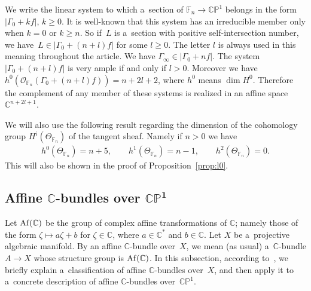 \documentclass[11pt]{article}
\numberwithin{equation}{section}
\begin{document}
We write the linear system to which a~section of $\mathbb{F}_n\to\mathbb{CP}^1$ belongs in the form $|\Gamma_0+kf|$, $k\ge 0$.
It is well-known that this system has an irreducible member only when $k=0$ or $k\ge n$.
So if~$L$ is a~section with positive self-intersection number, we have~$L\in |\Gamma_0 + (n+l)f|$ for some $l\ge 0$.
The letter $l$ is always used in this meaning throughout the article.
We have $\Gamma_{\infty}\in |\Gamma_0+nf|$.
The system $|\Gamma_0 + (n+l)f|$ is very ample if and only if $l>0$.
Moreover we have $h^0(\mathscr O_{\mathbb{F}_n}(\Gamma_0+(n+l)f))= n+2l+2$, where $h^0$ means $\dim H^0$.
Therefore the complement of any member of these systems is realized in an af\/f\/ine space $\mathbb{C}^{n+2l+1}$.

We will also use the following result regarding the dimension of the cohomology group $H^i(\Theta_{\mathbb{F}_n})$ of
the tangent sheaf.
Namely if $n>0$ we have \cite{MKbook}
\begin{gather}
\label{cohohir}
h^0(\Theta_{\mathbb{F}_n}) = n + 5,
\qquad
h^1(\Theta_{\mathbb{F}_n}) = n - 1,
\qquad
h^2(\Theta_{\mathbb{F}_n}) = 0.
\end{gather}
This will also be shown in the proof of Proposition~\ref{prop:l0}.


\subsection[Af\/f\/ine $\mathbb{C}$-bundles over $\mathbb{CP}^1$]{Af\/f\/ine
$\boldsymbol{\mathbb{C}}$-bundles over $\boldsymbol{\mathbb{CP}^1}$}
\label{ss:ab}

Let ${\rm Af}(\mathbb{C})$ be the group of complex af\/f\/ine transformations of $\mathbb{C}$; namely those of the form
$\zeta\mapsto a\zeta + b$ for $\zeta\in \mathbb{C}$, where $a\in \mathbb{C}^*$ and $b\in \mathbb{C}$.
Let $X$ be a~projective algebraic manifold.
By an af\/f\/ine $\mathbb{C}$-bundle over~$X$, we mean (as usual) a~$\mathbb{C}$-bundle $A\to X$ whose structure group
is ${\rm {Af}}(\mathbb{C})$.
In this subsection, according to~\cite{At55}, we brief\/ly explain a~classif\/ication of af\/f\/ine $\mathbb{C}$-bundles
over~$X$, and then apply it to a~concrete description of af\/f\/ine $\mathbb{C}$-bundles over~$\mathbb{CP}^1$.
\end{document}
